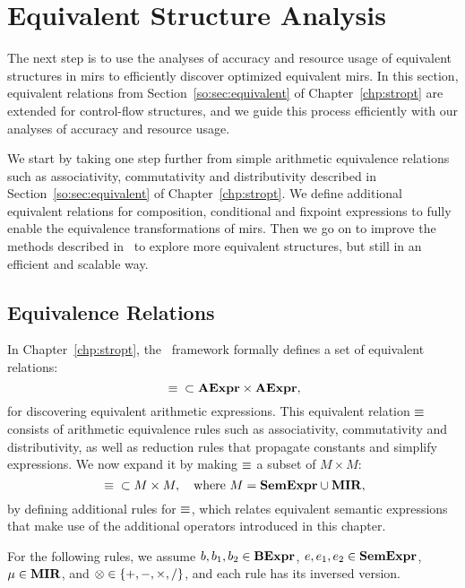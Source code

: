 \section{Equivalent Structure Analysis}
\label{po:sec:equivalence_analysis}

The next step is to use the analyses of accuracy and resource usage of
equivalent structures in \glspl{mir} to efficiently discover optimized
equivalent \glspl{mir}.  In this section, equivalent relations from
Section~\ref{so:sec:equivalent} of Chapter~\ref{chp:stropt} are extended
for control-flow structures, and we guide this process efficiently with our
analyses of accuracy and resource usage.

We start by taking one step further from simple arithmetic equivalence
relations such as associativity, commutativity and distributivity described
in Section~\ref{so:sec:equivalent} of Chapter~\ref{chp:stropt}.  We define
additional equivalent relations for composition, conditional and fixpoint
expressions to fully enable the equivalence transformations of \glspl{mir}.
Then we go on to improve the methods described in \soap~to explore more
equivalent structures, but still in an efficient and scalable way.


\subsection{Equivalence Relations}

In Chapter~\ref{chp:stropt}, the \soap~framework formally defines a set of
equivalent relations:
\begin{equation}
    {{}\ensuremath\equiv{}} \subset \mathbf{AExpr} \times \mathbf{AExpr},
\end{equation}
for discovering equivalent arithmetic expressions.  This equivalent relation
$\equiv$ consists of arithmetic equivalence rules such as associativity,
commutativity and distributivity, as well as reduction rules that propagate
constants and simplify expressions.  We now expand it by making $\equiv$ a
subset of $M \times M$:
\begin{equation}
    {{}\ensuremath\equiv{}} \subset M \times M, \quad
    \text{where~} M = \mathbf{SemExpr} \cup \mathbf{MIR},
\end{equation}
by defining additional rules for $\equiv$, which relates equivalent semantic
expressions that make use of the additional operators introduced in this
chapter.

For the following rules, we assume $b, b_1, b_2 \in \mathbf{BExpr}$, $e, e_1, e_2
\in \mathbf{SemExpr}$, $\mu \in \mathbf{MIR}$, and $\otimes \in \{+, -, \times, /\}$, and
each rule has its inversed version.

